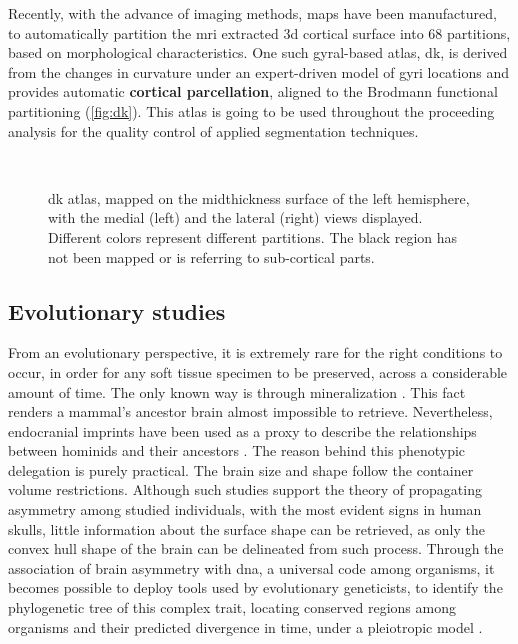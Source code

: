  Recently, with the advance of imaging methods, maps have been manufactured, to automatically partition the \ac{mri} extracted \ac{3d} cortical surface into 68 partitions, based on morphological characteristics. One such gyral-based atlas, \ac{dk}, is derived from the changes in curvature under an expert-driven model of gyri locations \cite{Desikan2006} and provides automatic \textbf{cortical parcellation}, aligned to the Brodmann functional partitioning (\autoref{fig:dk}). This atlas is going to be used throughout the proceeding analysis for the quality control of applied segmentation techniques.
 
 \begin{figure}[H]
 	\centering
 	\\
 	\caption[Desikan-Killiany atlas on midthickness surface]{\Acl{dk} atlas, mapped on the midthickness surface of the left hemisphere, with the medial (left) and the lateral (right) views displayed.\cite{Dickie2019} Different colors represent different partitions. The black region has not been mapped or is referring to sub-cortical parts.}
 	\label{fig:dk}
 \end{figure}
 
 \subsection{Evolutionary studies}
 From an evolutionary perspective, it is extremely rare for the right conditions to occur, in order for any soft tissue specimen to be preserved, across a considerable amount of time. The only known way is through mineralization \cite{Purnell2018}. This fact renders a mammal's ancestor brain almost impossible to retrieve. Nevertheless, endocranial imprints have been used as a proxy to describe the relationships between hominids and their ancestors \cite{Balzeau2012,Neubauer2020}. The reason behind this phenotypic delegation is purely practical. The brain size and shape follow the container volume restrictions. Although such studies support the theory of propagating asymmetry among studied individuals, with the most evident signs in human skulls, little information about the surface shape can be retrieved, as only the convex hull shape of the brain can be delineated from such process. Through the association of brain asymmetry with \acs{dna}, a universal code among organisms, it becomes possible to deploy tools used by evolutionary geneticists, to identify the phylogenetic tree of this complex trait, locating conserved regions among organisms and their predicted divergence in time, under a pleiotropic model \cite{Koch2021}.
 
